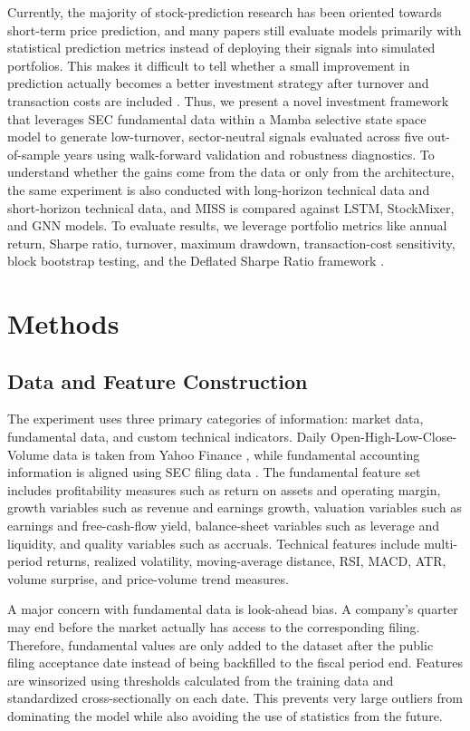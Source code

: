 \documentclass[12pt]{article}
\begin{document}
Currently, the majority of stock-prediction research has been oriented towards short-term price prediction, and many papers still evaluate models primarily with statistical prediction metrics instead of deploying their signals into simulated portfolios. This makes it difficult to tell whether a small improvement in prediction actually becomes a better investment strategy after turnover and transaction costs are included \cite{fischer2018,demiguel2020}. Thus, we present a novel investment framework that leverages SEC fundamental data within a Mamba selective state space model to generate low-turnover, sector-neutral signals evaluated across five out-of-sample years using walk-forward validation and robustness diagnostics. To understand whether the gains come from the data or only from the architecture, the same experiment is also conducted with long-horizon technical data and short-horizon technical data, and MISS is compared against LSTM, StockMixer, and GNN models. To evaluate results, we leverage portfolio metrics like annual return, Sharpe ratio, turnover, maximum drawdown, transaction-cost sensitivity, block bootstrap testing, and the Deflated Sharpe Ratio framework \cite{bailey2014}.

\section{Methods}
\subsection{Data and Feature Construction}
The experiment uses three primary categories of information: market data, fundamental data, and custom technical indicators. Daily Open-High-Low-Close-Volume data is taken from Yahoo Finance \cite{yahoo2026}, while fundamental accounting information is aligned using SEC filing data \cite{sec2025}. The fundamental feature set includes profitability measures such as return on assets and operating margin, growth variables such as revenue and earnings growth, valuation variables such as earnings and free-cash-flow yield, balance-sheet variables such as leverage and liquidity, and quality variables such as accruals. Technical features include multi-period returns, realized volatility, moving-average distance, RSI, MACD, ATR, volume surprise, and price-volume trend measures.

A major concern with fundamental data is look-ahead bias. A company's quarter may end before the market actually has access to the corresponding filing. Therefore, fundamental values are only added to the dataset after the public filing acceptance date instead of being backfilled to the fiscal period end. Features are winsorized using thresholds calculated from the training data and standardized cross-sectionally on each date. This prevents very large outliers from dominating the model while also avoiding the use of statistics from the future.
\end{document}
